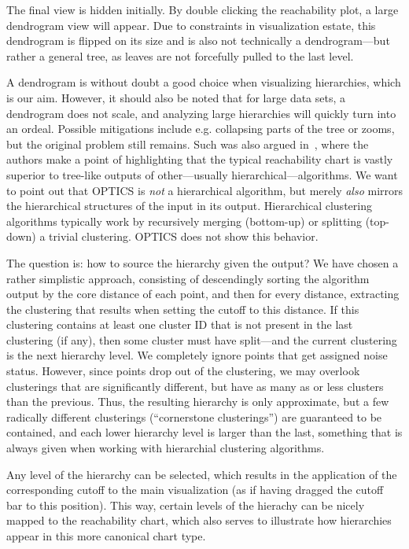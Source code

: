 \documentclass{vgtc}                          %
\begin{document}
The final view is hidden initially. By double clicking the reachability plot, a
large dendrogram view will appear. Due to constraints in visualization estate,
this dendrogram is flipped on its size and is also not technically a dendrogram---but
rather a general tree, as leaves are not forcefully pulled to the last level.

A dendrogram is without doubt a good choice when visualizing hierarchies, which
is our aim. However, it should also be noted that for large data sets, a
dendrogram does not scale, and analyzing large hierarchies will quickly turn
into an ordeal.  Possible mitigations include e.g. collapsing parts of the tree
or zooms, but the original problem still remains. Such was also argued
in~\cite{optics}, where the authors make a point of highlighting that the
typical reachability chart is vastly superior to tree-like outputs of
other---usually hierarchical---algorithms. We want to point out that OPTICS is
\emph{not} a hierarchical algorithm, but merely \emph{also} mirrors the
hierarchical structures of the input in its output. Hierarchical clustering
algorithms typically work by recursively merging (bottom-up) or splitting
(top-down) a trivial clustering.  OPTICS does not show this behavior.

The question is: how to source the hierarchy given the output? We have chosen a
rather simplistic approach, consisting of descendingly sorting the algorithm
output by the core distance of each point, and then for every distance,
extracting the clustering that results when setting the cutoff to this
distance. If this clustering contains at least one cluster ID that is not
present in the last clustering (if any), then some cluster must have
split---and the current clustering is the next hierarchy level.  We completely
ignore points that get assigned noise status.  However, since points drop out
of the clustering, we may overlook clusterings that are significantly
different, but have as many as or less clusters than the previous. Thus, the
resulting hierarchy is only approximate, but a few radically different
clusterings (``cornerstone clusterings'') are guaranteed to be contained, and
each lower hierarchy level is larger than the last, something that is always
given when working with hierarchial clustering algorithms.

Any level of the hierarchy can be selected, which results in the application of
the corresponding cutoff to the main visualization (as if having dragged the
cutoff bar to this position). This way, certain levels of the hierachy can be
nicely mapped to the reachability chart, which also serves to illustrate how
hierarchies appear in this more canonical chart type.
\end{document}
